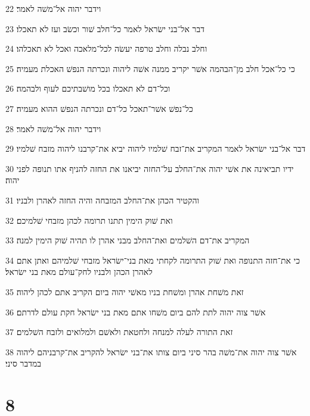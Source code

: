 \par 22 וידבר יהוה אל־משׁה לאמר׃
\par 23 דבר אל־בני ישׂראל לאמר כל־חלב שׁור וכשׂב ועז לא תאכלו׃
\par 24 וחלב נבלה וחלב טרפה יעשׂה לכל־מלאכה ואכל לא תאכלהו׃
\par 25 כי כל־אכל חלב מן־הבהמה אשׁר יקריב ממנה אשׁה ליהוה ונכרתה הנפשׁ האכלת מעמיה׃
\par 26 וכל־דם לא תאכלו בכל מושׁבתיכם לעוף ולבהמה׃
\par 27 כל־נפשׁ אשׁר־תאכל כל־דם ונכרתה הנפשׁ ההוא מעמיה׃
\par 28 וידבר יהוה אל־משׁה לאמר׃
\par 29 דבר אל־בני ישׂראל לאמר המקריב את־זבח שׁלמיו ליהוה יביא את־קרבנו ליהוה מזבח שׁלמיו׃
\par 30 ידיו תביאינה את אשׁי יהוה את־החלב על־החזה יביאנו את החזה להניף אתו תנופה לפני יהוה׃
\par 31 והקטיר הכהן את־החלב המזבחה והיה החזה לאהרן ולבניו׃
\par 32 ואת שׁוק הימין תתנו תרומה לכהן מזבחי שׁלמיכם׃
\par 33 המקריב את־דם השׁלמים ואת־החלב מבני אהרן לו תהיה שׁוק הימין למנה׃
\par 34 כי את־חזה התנופה ואת שׁוק התרומה לקחתי מאת בני־ישׂראל מזבחי שׁלמיהם ואתן אתם לאהרן הכהן ולבניו לחק־עולם מאת בני ישׂראל׃
\par 35 זאת משׁחת אהרן ומשׁחת בניו מאשׁי יהוה ביום הקריב אתם לכהן ליהוה׃
\par 36 אשׁר צוה יהוה לתת להם ביום משׁחו אתם מאת בני ישׂראל חקת עולם לדרתם׃
\par 37 זאת התורה לעלה למנחה ולחטאת ולאשׁם ולמלואים ולזבח השׁלמים׃
\par 38 אשׁר צוה יהוה את־משׁה בהר סיני ביום צותו את־בני ישׂראל להקריב את־קרבניהם ליהוה במדבר סיני׃

\chapter{8}

